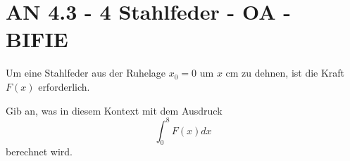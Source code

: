 \section{AN 4.3 - 4 Stahlfeder - OA - BIFIE}

\begin{beispiel}[AN 4.3]{1} %
				Um eine Stahlfeder aus der Ruhelage $x_0=0$ um $x$ cm zu dehnen, ist die Kraft $F(x)$ erforderlich.
				
				Gib an, was in diesem Kontext mit dem Ausdruck $$\int_0^8{F(x)}dx$$ berechnet wird.
				\leer
				
\end{beispiel}